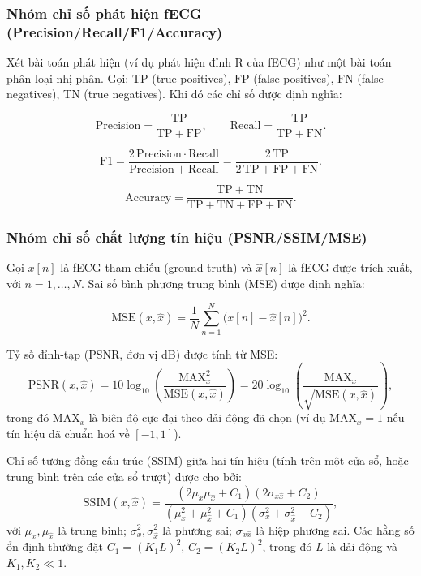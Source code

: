 \subsubsection{Nhóm chỉ số phát hiện fECG (Precision/Recall/F1/Accuracy)}
Xét bài toán phát hiện (ví dụ phát hiện đỉnh R của fECG) như một bài toán phân loại nhị phân. Gọi:
$\mathrm{TP}$ (true positives), $\mathrm{FP}$ (false positives),
$\mathrm{FN}$ (false negatives), $\mathrm{TN}$ (true negatives).
Khi đó các chỉ số được định nghĩa:

\begin{equation}
\mathrm{Precision} = \frac{\mathrm{TP}}{\mathrm{TP}+\mathrm{FP}},
\qquad
\mathrm{Recall} = \frac{\mathrm{TP}}{\mathrm{TP}+\mathrm{FN}}.
\end{equation}

\begin{equation}
\mathrm{F1} = \frac{2\,\mathrm{Precision}\cdot \mathrm{Recall}}{\mathrm{Precision}+\mathrm{Recall}}
           = \frac{2\,\mathrm{TP}}{2\,\mathrm{TP}+\mathrm{FP}+\mathrm{FN}}.
\end{equation}

\begin{equation}
\mathrm{Accuracy} = \frac{\mathrm{TP}+\mathrm{TN}}{\mathrm{TP}+\mathrm{TN}+\mathrm{FP}+\mathrm{FN}}.
\end{equation}



\subsubsection{Nhóm chỉ số chất lượng tín hiệu (PSNR/SSIM/MSE)}
Gọi $x[n]$ là fECG tham chiếu (ground truth) và $\hat{x}[n]$ là fECG được trích xuất, với $n=1,\dots,N$.
Sai số bình phương trung bình (MSE) được định nghĩa:

\begin{equation}
\mathrm{MSE}(x,\hat{x})=\frac{1}{N}\sum_{n=1}^{N}\big(x[n]-\hat{x}[n]\big)^2 .
\end{equation}

Tỷ số đỉnh-tạp (PSNR, đơn vị dB) được tính từ MSE:
\begin{equation}
\mathrm{PSNR}(x,\hat{x}) = 10\log_{10}\left(\frac{\mathrm{MAX}_x^2}{\mathrm{MSE}(x,\hat{x})}\right)
=20\log_{10}\left(\frac{\mathrm{MAX}_x}{\sqrt{\mathrm{MSE}(x,\hat{x})}}\right),
\end{equation}
trong đó $\mathrm{MAX}_x$ là biên độ cực đại theo dải động đã chọn (ví dụ $\mathrm{MAX}_x=1$ nếu tín hiệu đã chuẩn hoá về $[-1,1]$).

Chỉ số tương đồng cấu trúc (SSIM) giữa hai tín hiệu (tính trên một cửa sổ, hoặc trung bình trên các cửa sổ trượt) được cho bởi:
\begin{equation}
\mathrm{SSIM}(x,\hat{x})=
\frac{(2\mu_x\mu_{\hat{x}}+C_1)(2\sigma_{x\hat{x}}+C_2)}
{(\mu_x^2+\mu_{\hat{x}}^2+C_1)(\sigma_x^2+\sigma_{\hat{x}}^2+C_2)},
\end{equation}
với $\mu_x,\mu_{\hat{x}}$ là trung bình; $\sigma_x^2,\sigma_{\hat{x}}^2$ là phương sai; $\sigma_{x\hat{x}}$ là hiệp phương sai.
Các hằng số ổn định thường đặt $C_1=(K_1L)^2$, $C_2=(K_2L)^2$, trong đó $L$ là dải động và $K_1,K_2\ll 1$.




